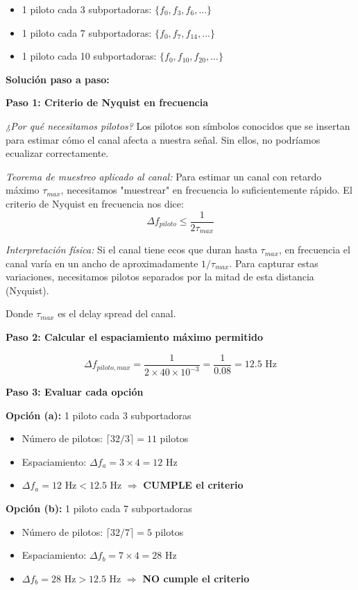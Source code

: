 \documentclass[11pt,a4paper]{article}
\begin{document}
\begin{itemize}
    \item[(a)] 1 piloto cada 3 subportadoras: $\{f_0, f_3, f_6, ...\}$
    \item[(b)] 1 piloto cada 7 subportadoras: $\{f_0, f_7, f_{14}, ...\}$
    \item[(c)] 1 piloto cada 10 subportadoras: $\{f_0, f_{10}, f_{20}, ...\}$
\end{itemize}

\vspace{0.3cm}
\textbf{Solución paso a paso:}

\textbf{Paso 1: Criterio de Nyquist en frecuencia}

\textit{¿Por qué necesitamos pilotos?} Los pilotos son símbolos conocidos que se insertan para estimar cómo el canal afecta a nuestra señal. Sin ellos, no podríamos ecualizar correctamente.

\textit{Teorema de muestreo aplicado al canal:} Para estimar un canal con retardo máximo $\tau_{max}$, necesitamos "muestrear" en frecuencia lo suficientemente rápido. El criterio de Nyquist en frecuencia nos dice:
\[
\Delta f_{piloto} \leq \frac{1}{2\tau_{max}}
\]

\textit{Interpretación física:} Si el canal tiene ecos que duran hasta $\tau_{max}$, en frecuencia el canal varía en un ancho de aproximadamente $1/\tau_{max}$. Para capturar estas variaciones, necesitamos pilotos separados por la mitad de esta distancia (Nyquist).

Donde $\tau_{max}$ es el delay spread del canal.

\textbf{Paso 2: Calcular el espaciamiento máximo permitido}

\[
\Delta f_{piloto,max} = \frac{1}{2 \times 40 \times 10^{-3}} = \frac{1}{0.08} = 12.5 \text{ Hz}
\]

\textbf{Paso 3: Evaluar cada opción}

\textbf{Opción (a):} 1 piloto cada 3 subportadoras
\begin{itemize}
    \item Número de pilotos: $\lceil 32/3 \rceil = 11$ pilotos
    \item Espaciamiento: $\Delta f_a = 3 \times 4 = 12$ Hz
    \item $\Delta f_a = 12 \text{ Hz} < 12.5$ Hz $\Rightarrow$ \textbf{CUMPLE el criterio} \checkmark
\end{itemize}

\textbf{Opción (b):} 1 piloto cada 7 subportadoras
\begin{itemize}
    \item Número de pilotos: $\lceil 32/7 \rceil = 5$ pilotos
    \item Espaciamiento: $\Delta f_b = 7 \times 4 = 28$ Hz
    \item $\Delta f_b = 28 \text{ Hz} > 12.5$ Hz $\Rightarrow$ \textbf{NO cumple el criterio}
\end{itemize}
\end{document}
